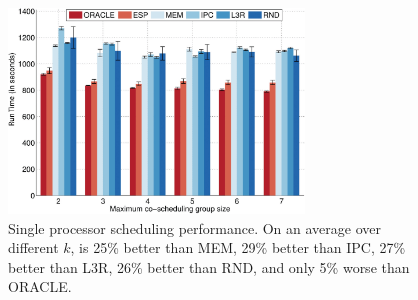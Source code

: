 \begin{figure}[t!]
\begin{center}
 \includegraphics[width=0.7\textwidth]{figures/barmainCOPY.pdf}
 \caption{\small Single processor scheduling performance. On an
   average over different $k$, \SYSTEM{} is 25\% better than MEM, 29\%
   better than IPC, 27\% better than L3R, 26\% better than RND, and
   only 5\% worse than ORACLE. }
\label{fig:bar_single_processor}
\end{center}
\end{figure}

